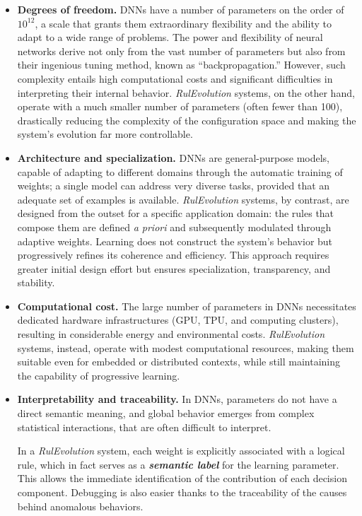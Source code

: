 \documentclass[12pt,a4paper]{article}
\begin{document}
\begin{itemize}
    \item \textbf{Degrees of freedom.}  
    DNNs have a number of parameters on the order of $10^{12}$, a scale that grants them extraordinary flexibility and the ability to adapt to a wide range of problems.  
    The power and flexibility of neural networks derive not only from the vast number of parameters but also from their ingenious tuning method, known as “backpropagation.”  
    However, such complexity entails high computational costs and significant difficulties in interpreting their internal behavior.  
    \textit{RulEvolution} systems, on the other hand, operate with a much smaller number of parameters (often fewer than 100), drastically reducing the complexity of the configuration space and making the system’s evolution far more controllable.

    \item \textbf{Architecture and specialization.}  
    DNNs are general-purpose models, capable of adapting to different domains through the automatic training of weights; a single model can address very diverse tasks, provided that an adequate set of examples is available.  
    \textit{RulEvolution} systems, by contrast, are designed from the outset for a specific application domain: the rules that compose them are defined \textit{a priori} and subsequently modulated through adaptive weights.  
    Learning does not construct the system’s behavior but progressively refines its coherence and efficiency.  
    This approach requires greater initial design effort but ensures specialization, transparency, and stability.

    \item \textbf{Computational cost.}  
    The large number of parameters in DNNs necessitates dedicated hardware infrastructures (GPU, TPU, and computing clusters), resulting in considerable energy and environmental costs.  
    \textit{RulEvolution} systems, instead, operate with modest computational resources, making them suitable even for embedded or distributed contexts, while still maintaining the capability of progressive learning.

    \item \textbf{Interpretability and traceability.}  
    In DNNs, parameters do not have a direct semantic meaning, and global behavior emerges from complex statistical interactions, that are often difficult to interpret.  

    In a \textit{RulEvolution} system, each weight is explicitly associated with a logical rule, which in fact serves as a \textit{\textbf{semantic label}} for the learning parameter.  
    This allows the immediate identification of the contribution of each decision component.  
    Debugging is also easier thanks to the traceability of the causes behind anomalous behaviors.


\end{itemize}
\end{document}
